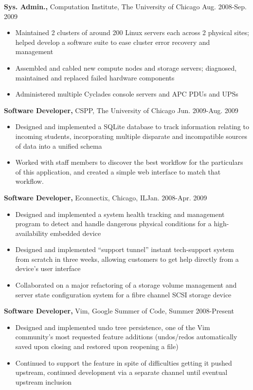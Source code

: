 \documentclass[line,overlapped]{res}
\begin{document}
\begin{resume}
{\bf Sys. Admin.,} Computation Institute, The University of Chicago \hfill Aug. 2008-Sep. 2009
\begin{itemize} \itemsep -2pt %
    \item Maintained 2 clusters of around 200 Linux servers each across 2 physical sites; helped develop a software suite to ease cluster error recovery and management
    \item Assembled and cabled new compute nodes and storage servers; diagnosed, maintained and replaced failed hardware components
    \item Administered multiple Cyclades console servers and APC PDUs and UPSs
\end{itemize} \itemsep -2pt
\vspace{-10pt}
{\bf Software Developer,} CSPP, The University of Chicago \hfill Jun. 2009-Aug. 2009
\begin{itemize} \itemsep -2pt
    \item Designed and implemented a SQLite database to track information relating to incoming students, incorporating multiple disparate and incompatible sources of data into a unified schema
    \item Worked with staff members to discover the best workflow for the particulars of this application, and created a simple web interface to match that workflow.
\end{itemize}
\vspace{-10pt}

{\bf Software Developer,} Econnectix, Chicago, IL\hfill Jan. 2008-Apr. 2009
\begin{itemize} \itemsep -2pt %
    \item Designed and implemented a system health tracking and management program to detect and handle dangerous physical conditions for a high-availability embedded device
    \item Designed and implemented ``support tunnel'' instant tech-support system from scratch in three weeks, allowing customers to get help directly from a device's user interface
    \item Collaborated on a major refactoring of a storage volume management and server state configuration system for a fibre channel SCSI storage device
\end{itemize}
\vspace{-10pt}

{\bf Software Developer,} Vim, Google Summer of Code, \hfill Summer 2008-Present
\begin{itemize} \itemsep -2pt
    \item Designed and implemented undo tree persistence, one of the Vim community's most requested feature additions (undos/redos automatically saved upon closing and restored upon reopening a file)\footnotemark[2]
    \item Continued to support the feature in spite of difficulties getting it pushed upstream, continued development via a separate channel until eventual upstream inclusion
\end{itemize}


\end{resume}
\end{document}
